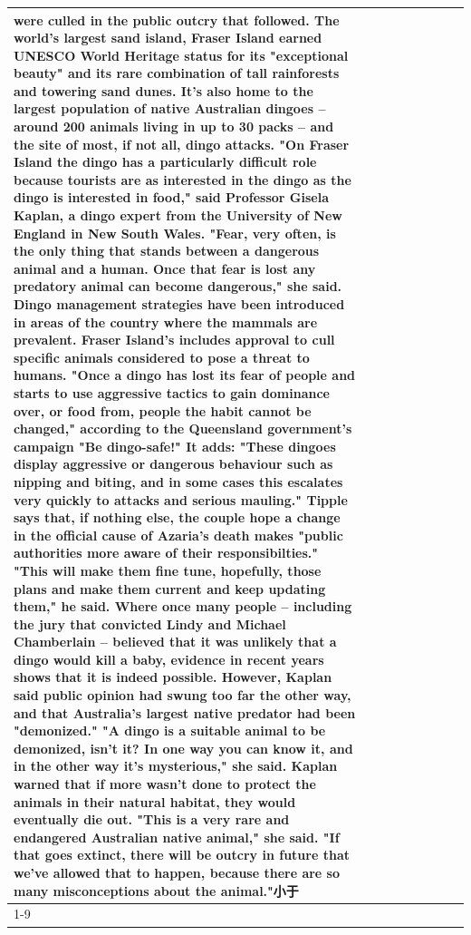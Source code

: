 \begin{table}[H]
\begin{tabular}{lllrlllll}
were culled in the public outcry that followed. The world's largest sand island, Fraser Island earned UNESCO World Heritage status for its "exceptional beauty" and its rare combination of tall rainforests and towering sand dunes. It's also home to the largest population of native Australian dingoes -- around 200 animals living in up to 30 packs -- and the site of most, if not all, dingo attacks. "On Fraser Island the dingo has a particularly difficult role because tourists are as interested in the dingo as the dingo is interested in food," said Professor Gisela Kaplan, a dingo expert from the University of New England in New South Wales. "Fear, very often, is the only thing that stands between a dangerous animal and a human. Once that fear is lost any predatory animal can become dangerous," she said. Dingo management strategies have been introduced in areas of the country where the mammals are prevalent. Fraser Island's includes approval to cull specific animals considered to pose a threat to humans. "Once a dingo has lost its fear of people and starts to use aggressive tactics to gain dominance over, or food from, people the habit cannot be changed," according to the Queensland government's campaign "Be dingo-safe!" It adds: "These dingoes display aggressive or dangerous behaviour such as nipping and biting, and in some cases this escalates very quickly to attacks and serious mauling." Tipple says that, if nothing else, the couple hope a change in the official cause of Azaria's death makes "public authorities more aware of their responsibilties." "This will make them fine tune, hopefully, those plans and make them current and keep updating them," he said. Where once many people -- including the jury that convicted Lindy and Michael Chamberlain -- believed that it was unlikely that a dingo would kill a baby, evidence in recent years shows that it is indeed possible. However, Kaplan said public opinion had swung too far the other way, and that Australia's largest native predator had been "demonized." "A dingo is a suitable animal to be demonized, isn't it? In one way you can know it, and in the other way it's mysterious," she said. Kaplan warned that if more wasn't done to protect the animals in their natural habitat, they would eventually die out. "This is a very rare and endangered Australian native animal," she said. "If that goes extinct, there will be outcry in future that we've allowed that to happen, because there are so many misconceptions about the animal."小于 \\
\cline{1-9}

\end{tabular}
\end{table}
